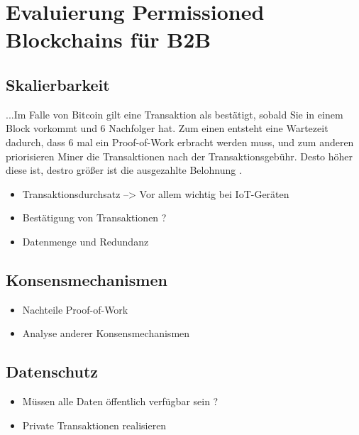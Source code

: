 \chapter{Evaluierung Permissioned Blockchains für B2B}
\label{cha:b2b-eval}


\section{Skalierbarkeit}
\label{sec:scalability-eval}

...Im Falle von Bitcoin gilt eine Transaktion als bestätigt, sobald Sie in einem Block vorkommt und 6 Nachfolger hat. Zum einen entsteht eine Wartezeit dadurch, dass 6 mal ein Proof-of-Work erbracht werden muss, und zum anderen priorisieren Miner die Transaktionen nach der Transaktionsgebühr. Desto höher diese ist, destro größer ist die ausgezahlte Belohnung \cite{BuchkoHowLongBitcoin2017}.
\begin{itemize}
    \item Transaktionsdurchsatz --> Vor allem wichtig bei IoT-Geräten
    \item Bestätigung von Transaktionen ?
    \item Datenmenge und Redundanz
\end{itemize}

\label{subsec:eval-konsens}
\section{Konsensmechanismen}


\begin{itemize}
    \item Nachteile Proof-of-Work
    \item Analyse anderer Konsensmechanismen
\end{itemize}

\section{Datenschutz}

\begin{itemize}
    \item Müssen alle Daten öffentlich verfügbar sein ?
    \item Private Transaktionen realisieren
\end{itemize}


